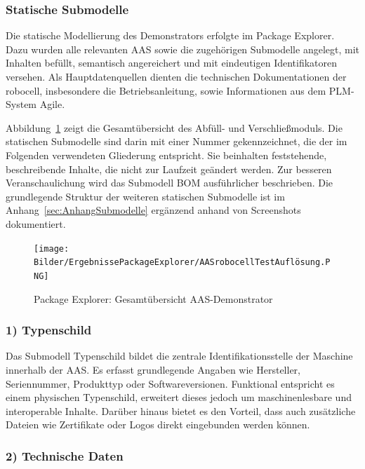 \subsubsection{Statische Submodelle}
Die statische Modellierung des Demonstrators erfolgte im Package Explorer.
Dazu wurden alle relevanten AAS sowie die zugehörigen Submodelle angelegt, mit Inhalten befüllt, semantisch angereichert und mit eindeutigen Identifikatoren versehen.
Als Hauptdatenquellen dienten die technischen Dokumentationen der robocell, insbesondere die Betriebsanleitung, sowie Informationen aus dem PLM-System Agile.

Abbildung~\ref{fig:PackageExplorerRobocell} zeigt die Gesamtübersicht des Abfüll- und Verschließmoduls. 
Die statischen Submodelle sind darin mit einer Nummer gekennzeichnet, die der im Folgenden verwendeten Gliederung entspricht. 
Sie beinhalten feststehende, beschreibende Inhalte, die nicht zur Laufzeit geändert werden. 
Zur besseren Veranschaulichung wird das Submodell BOM ausführlicher beschrieben.
Die grundlegende Struktur der weiteren statischen Submodelle ist im Anhang~\ref{sec:AnhangSubmodelle} ergänzend anhand von Screenshots dokumentiert.

\begin{figure}[htbp]
    \centering
        \texttt{[image: Bilder/ErgebnissePackageExplorer/AASrobocellTestAuflösung.PNG]}
    \caption{Package Explorer: Gesamtübersicht AAS-Demonstrator}
    \label{fig:PackageExplorerRobocell}
\end{figure}

\subsubsection*{1) Typenschild}
\vspace{-0.5em} 
Das Submodell Typenschild bildet die zentrale Identifikationsstelle der Maschine innerhalb der AAS. 
Es erfasst grundlegende Angaben wie Hersteller, Seriennummer, Produkttyp oder Softwareversionen. 
Funktional entspricht es einem physischen Typenschild, erweitert dieses jedoch um maschinenlesbare und interoperable Inhalte. 
Darüber hinaus bietet es den Vorteil, dass auch zusätzliche Dateien wie Zertifikate oder Logos direkt eingebunden werden können.

\subsubsection*{2) Technische Daten}
\vspace{-0.5em}


